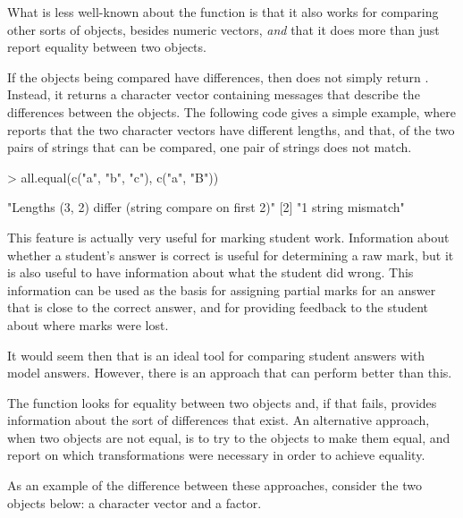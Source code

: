 What is less well-known about the  function
is that it also works for comparing other sorts of \R{} objects,
besides numeric vectors, \emph{and} that it does more than just
report equality between two objects.  

If the objects being compared
have differences, then  does not simply return
.  Instead, it returns a character vector 
containing messages that describe the differences between the objects.
The following code gives a simple example, where 
reports that the two character vectors have different lengths,
and that, of the two pairs of strings that can be compared, one pair
of strings does not match.

\begin{Schunk}
\begin{Sinput}
> all.equal(c("a", "b", "c"), c("a", "B"))
\end{Sinput}
\end{Schunk}
{\footnotesize
\begin{Schunk}
\begin{Soutput}
[1] "Lengths (3, 2) differ (string compare on first 2)"
[2] "1 string mismatch"                                
\end{Soutput}
\end{Schunk}
} %

This feature is actually very useful for marking student work.
Information about whether a student's answer is correct is useful
for determining a raw mark, but it is also useful to have 
information about what the student did wrong.  This information
can be used
as the basis for assigning partial marks for an answer that
is close to the correct answer, and for providing feedback 
to the student about where marks were lost.

It would seem then that  is an ideal 
tool for comparing student answers with model answers.
However, there is an approach that can perform better than this.

The  function looks for equality between two objects
and, if that fails,
provides information about the sort of differences that exist.
An alternative approach, when two objects are not equal, is to 
try to  the objects to make them equal, and report
on which transformations were necessary in order to achieve equality.

As an example of the difference between these approaches, consider the
two objects below:  a character vector and a factor.

